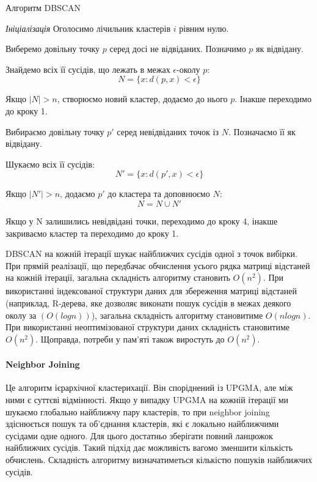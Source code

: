             \begin{algorithm}
                \caption{Алгоритм DBSCAN}
                \enumerate
                    \item [] \emph{Ініціалізація} Оголосимо лічильник кластерів $i$ рівним нулю.
                    \item Виберемо довільну точку $p$ серед досі не відвіданих. Позначимо $p$ як відвідану.
                    \item Знайдемо всіх її сусідів, що лежать в межах $\epsilon$-околу $p$:
                        \[
                            N = \{x : d(p, x) < \epsilon\}
                        \]
                    \item Якщо $\mid N \mid > n$, створюємо новий кластер, додаємо до нього $p$. Інакше переходимо до кроку 1.
                    \item Вибираємо довільну точку $p'$ серед невідвіданих точок із $N$. Позначаємо її як відвідану.
                    \item Шукаємо всіх її сусідів:
                        \[
                            N' = \{x : d(p', x) < \epsilon\}
                        \]
                    \item Якщо $\mid N' \mid > n$, додаємо $p'$ до кластера та доповнюємо $N$:
                        \[
                            N = N \cup N'
                        \]
                    \item Якщо у N залишились невідвідані точки, переходимо до кроку 4, інакше закриваємо кластер та переходимо до кроку 1.
            \end{algorithm}
            
            DBSCAN на кожній ітерації шукає найближчих сусідів одної з точок вибірки. При прямій реалізації, що передбачає обчислення усього рядка матриці відстаней на кожній ітерації, загальна складність алгоритму становить $O(n^2)$. При використанні індексованої структури даних для збереження матриці відстаней (наприклад, R-дерева, яке дозволяє виконати пошук сусідів в межах деякого околу за $(O(log n))$), загальна складність алгоритму становитиме $O(n log n)$. При використанні неоптимізованої структури даних складність становитиме $O(n^2)$. Щоправда, потреби у пам'яті також виростуть до $O(n^2)$.
        
        \paragraph {Neighbor Joining}
            Це алгоритм ієрархічної кластерихації. Він споріднений із UPGMA, але між ними є суттєві відмінності. Якщо у випадку UPGMA на кожній ітерації ми шукаємо глобально найближчу пару кластерів, то при neighbor joining здіснюється пошук та об'єднання кластерів, які є локально найближчими сусідами одне одного. Для цього достатньо зберігати повний ланцюжок найближчих сусідів. Такий підхід дає можливість вагомо зменшити кількість обчислень. Складність алгоритму визначатиметься кількістю пошуків найближчих сусідів.
            
